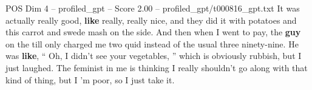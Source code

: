 \begin{textsample}{POS Dim 4 – profiled\_gpt – Score 2.00 – profiled\_gpt/t000816\_gpt.txt}  \label{ex:f4_pos_038}
It was actually really good, \textbf{like} really, really nice, and they did it with potatoes and this carrot and swede mash on the side.
And then when I went to pay, the \textbf{guy} on the till only charged me two quid instead of the usual three ninety-nine.
He was \textbf{like}, “ Oh, I didn't see your vegetables, ” which is obviously rubbish, but I just laughed.
The feminist in me is thinking I really shouldn't go along with that kind of thing, but I ’m poor, so I just take it.

\end{textsample}
